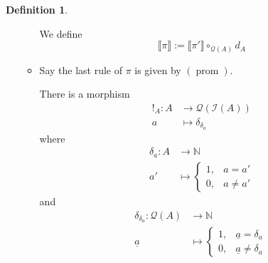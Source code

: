\documentclass[12pt]{article}
\theoremstyle{plain}
\theoremstyle{definition}
\newtheorem{defn}[thm]{Definition} %
\newcommand{\bb}[1]{\mathbb{#1}}
\newcommand{\call}[1]{\mathcal{#1}}
\newcommand{\Ical}{\call{I}}
\newcommand{\Qcal}{\call{Q}}
\newcommand{\lto}{\longrightarrow}
\newcommand{\prom}{(\operatorname{prom})}
\begin{document}
\begin{defn}
\begin{itemize}
\begin{itemize}
		We define
		\begin{equation}
			\llbracket \pi \rrbracket := \llbracket \pi' \rrbracket \circ_{\Qcal(A)} d_A
			\end{equation}
		\item Say the last rule of $\pi$ is given by $\prom$.
		
		There is a morphism
		\begin{align*}
			!_A: A &\lto \Qcal(\Ical(A))\\
			a &\longmapsto \delta_{\delta_a}
			\end{align*}
where
\begin{align*}
\delta_a: A &\lto \bb{N}\\
a' &\longmapsto
\begin{cases}
1,& a = a'\\
0,& a \neq a'
\end{cases}
\end{align*}
and
\begin{align*}
\delta_{\delta_a}: \call{Q}(A) &\lto \bb{N}\\
\underline{a} &\longmapsto
\begin{cases}
1,& \underline{a} = \delta_a\\
0,& \underline{a} \neq \delta_a\
\end{cases}
\end{align*}


\end{itemize}
\end{itemize}
\end{defn}
\end{document}
